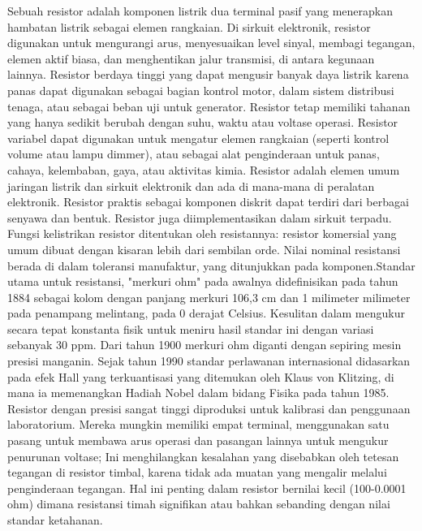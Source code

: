 Sebuah resistor adalah komponen listrik dua terminal pasif yang menerapkan hambatan listrik sebagai elemen rangkaian. Di sirkuit elektronik, resistor digunakan 
untuk mengurangi arus, menyesuaikan level sinyal, membagi tegangan, elemen aktif biasa, dan menghentikan jalur transmisi, di antara kegunaan lainnya. Resistor 
berdaya tinggi yang dapat mengusir banyak daya listrik karena panas dapat digunakan sebagai bagian kontrol motor, dalam sistem distribusi tenaga, atau sebagai 
beban uji untuk generator. Resistor tetap memiliki tahanan yang hanya sedikit berubah dengan suhu, waktu atau voltase operasi. Resistor variabel dapat digunakan 
untuk mengatur elemen rangkaian (seperti kontrol volume atau lampu dimmer), atau sebagai alat penginderaan untuk panas, cahaya, kelembaban, gaya, atau aktivitas 
kimia. Resistor adalah elemen umum jaringan listrik dan sirkuit elektronik dan ada di mana-mana di peralatan elektronik. Resistor praktis sebagai komponen diskrit dapat terdiri dari berbagai senyawa dan bentuk. Resistor juga diimplementasikan dalam sirkuit terpadu.
Fungsi kelistrikan resistor ditentukan oleh resistannya: resistor komersial yang umum dibuat dengan kisaran lebih dari sembilan orde. Nilai nominal resistansi berada di dalam toleransi manufaktur, yang ditunjukkan pada komponen.Standar utama untuk resistansi, "merkuri ohm" pada awalnya didefinisikan pada tahun 1884 sebagai kolom dengan panjang merkuri 106,3 cm dan 1 milimeter milimeter pada penampang melintang, pada 0 derajat Celsius. Kesulitan dalam mengukur secara tepat konstanta fisik untuk meniru hasil standar ini dengan variasi sebanyak 30 ppm. Dari tahun 1900 merkuri ohm diganti dengan sepiring mesin presisi manganin. Sejak tahun 1990 standar perlawanan internasional didasarkan pada efek Hall yang terkuantisasi yang ditemukan oleh Klaus von Klitzing, di mana ia memenangkan Hadiah Nobel dalam bidang Fisika pada tahun 1985. Resistor dengan presisi sangat tinggi diproduksi untuk kalibrasi dan penggunaan laboratorium. Mereka mungkin memiliki empat terminal, menggunakan satu pasang untuk membawa arus operasi dan pasangan lainnya untuk mengukur penurunan voltase; Ini menghilangkan kesalahan yang disebabkan oleh tetesan tegangan di resistor timbal, karena tidak ada muatan yang mengalir melalui penginderaan tegangan. Hal ini penting dalam resistor bernilai kecil (100-0.0001 ohm) dimana resistansi timah signifikan atau bahkan sebanding dengan nilai standar ketahanan.

